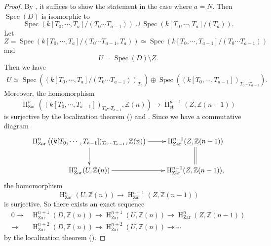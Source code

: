 \documentclass{article}
\newcommand{\spec}{\operatorname{Spec}}
\newcommand{\et}{\mathrm{\acute{e}t}}
\newcommand{\Zar}{\mathrm{Zar}}
\newcommand{\HO}{\operatorname{H}}
\begin{document}
%
\begin{proof}\upshape
By \cite[p.781, Corollary 3.5]{Ge}, it suffices to show the statement in the case where $a=N$. 
Then
$\spec(D)$ is isomorphic to
%
\begin{equation*}
\spec(
k[T_{0}, \cdots, T_{a}]
/(T_{0}\cdots T_{a-1})
)
\cup
\spec(
k[T_{0}, \cdots, T_{a}]
/(T_{a})
).
\end{equation*}
%
Let
%
\begin{equation*}
Z=\spec(
k[T_{0}, \cdots, T_{a}]/
(T_{0}\cdots T_{a-1}, T_{a})
)    
\simeq
\spec(
k[T_{0}, \cdots, T_{a-1}]/(T_{0}\cdots T_{a-1})
)
\end{equation*}
%
and 
%
\begin{equation*}
U=
\spec(D)
\setminus
Z.
\end{equation*}
%
Then we have
%
\begin{align*}
U\simeq
\spec\left(
(
k[T_{0}, \cdots, T_{a}]/(T_{0}\cdots T_{a-1})
)_{T_{a}}
\right)
\oplus
\spec\left(
(
k[T_{0}, \cdots, T_{a-1}]
)_{T_{0}\cdots T_{a-1}}
\right).
\end{align*}
%
Moreover,  the homomorphism
%
\begin{equation*}
\HO^{n}_{\Zar}\left(
(k[T_{0}, \cdots, T_{a-1}])_{T_{0}\cdots T_{a-1}},
\mathbb{Z}(n)
\right)
\to
\HO^{n-1}_{\et}(
Z, \mathbb{Z}(n-1)
)
\end{equation*}
%
is surjective by 
the localization theorem (\cite[p.779, Theorem 3.2]{Ge})
and
\cite[p.781, Corollary 3.5]{Ge}. 
Since we have a commutative diagram
%
\begin{equation*}
\xymatrix{
\HO^{n}_{\Zar}\left(
(k[T_{0}, \cdots, T_{a-1}])_{T_{0}\cdots T_{a-1}},
\mathbb{Z}(n)
\right)
\ar[r]\ar[d]
&
\HO^{n-1}_{\Zar}(
Z, 
\mathbb{Z}(n-1)
)\ar@{=}[d]
\\
\HO^{n}_{\Zar}(
U,
\mathbb{Z}(n)
)\ar[r]
&
\HO^{n-1}_{\Zar}(
Z, 
\mathbb{Z}(n-1)
),
}    
\end{equation*}
%
the homomorphism
%
\begin{equation*}
\HO^{n}_{\Zar}(U,
\mathbb{Z}(n))
\to
\HO^{n-1}_{\Zar}(
Z, \mathbb{Z}(n-1)
)
\end{equation*}
%
is surjective. So there exists an exact sequence
%
\begin{align*}
0\to&
\HO^{n+1}_{\Zar}(
D, \mathbb{Z}(n)
)
\to 
\HO^{n+1}_{\Zar}(
U, \mathbb{Z}(n)
)
\to 
\HO^{n}_{\Zar}(
Z, \mathbb{Z}(n-1)
)\\
\to&
\HO^{n+2}_{\Zar}(
D, \mathbb{Z}(n)
)
\to 
\HO^{n+2}_{\Zar}(
U, \mathbb{Z}(n)
)
\to
\cdots
\end{align*}
%
by the localization theorem (\cite[p.779, Theorem 3.2]{Ge}). 

\end{proof}
\end{document}
